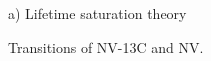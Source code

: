 \documentclass[preprintnumbers,amsmath,amssymb,twocolumn]{revtex4-1}
\begin{document}
\begin{figure}[!ht]
  \centering {}
  \caption{a) 
Lifetime saturation theory
 }
\end{figure}


\begin{figure}[!ht]
  \centering {}
  \caption{Transitions of NV-13C and NV.
 }
\end{figure}
\end{document}

